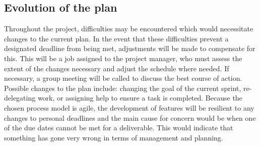 \documentclass{article}
\begin{document}
\subsection{Evolution of the plan} 
\begin{adjustwidth}{1em}{0pt}
Throughout the project, difficulties may be encountered which would necessitate changes to the current plan. In the event that these difficulties prevent a designated deadline from being met, adjustments will be made to compensate for this. This will be a job assigned to the project manager, who must assess the extent of the changes necessary and adjust the schedule where needed. If necessary, a group meeting will be called to discuss the best course of action. Possible changes to the plan include: changing the goal of the current sprint, re-delegating work, or assigning help to ensure a task is completed. Because the chosen process model is agile, the development of features will be resilient to any changes to personal deadlines and the main cause for concern would be when one of the due dates cannot be met for a deliverable. This would indicate that something has gone very wrong in terms of management and planning.
\end{adjustwidth}

\begin{comment}
\section{References}
Should be obvious...
\end{comment}
\end{document}
